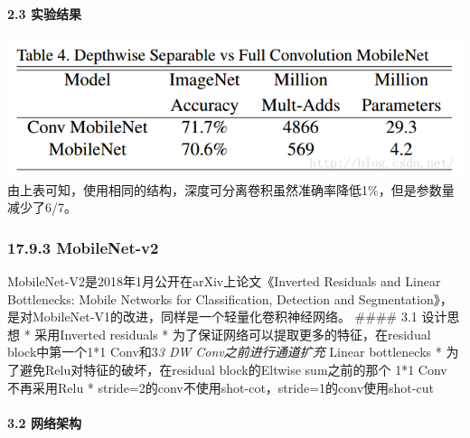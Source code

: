 \paragraph{2.3 实验结果}\label{ux5b9eux9a8cux7ed3ux679c-1}

\includegraphics{./img/ch17/16.png}
由上表可知，使用相同的结构，深度可分离卷积虽然准确率降低1\%，但是参数量减少了6/7。

\subsubsection{17.9.3 MobileNet-v2}\label{mobilenet-v2}

MobileNet-V2是2018年1月公开在arXiv上论文《Inverted Residuals and Linear
Bottlenecks: Mobile Networks for Classification, Detection and
Segmentation》，是对MobileNet-V1的改进，同样是一个轻量化卷积神经网络。
\#\#\#\# 3.1 设计思想 * 采用Inverted residuals *
为了保证网络可以提取更多的特征，在residual block中第一个1*1
Conv和3\emph{3 DW Conv之前进行通道扩充 } Linear bottlenecks *
为了避免Relu对特征的破坏，在residual block的Eltwise sum之前的那个 1*1
Conv 不再采用Relu *
stride=2的conv不使用shot-cot，stride=1的conv使用shot-cut

\paragraph{3.2 网络架构}\label{ux7f51ux7edcux67b6ux6784}

